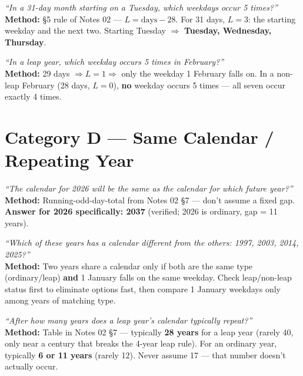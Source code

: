 \documentclass[11pt]{article}
\begin{document}
\begin{examplebox}
\emph{``In a 31-day month starting on a Tuesday, which weekdays occur 5 times?''} \\
\textbf{Method:} \S5 rule of Notes 02 --- $L = \text{days}-28$. For 31 days, $L=3$: the starting
weekday and the next two. Starting Tuesday $\Rightarrow$ \textbf{Tuesday, Wednesday, Thursday}.
\end{examplebox}

\begin{examplebox}
\emph{``In a leap year, which weekday occurs 5 times in February?''} \\
\textbf{Method:} 29 days $\Rightarrow L=1 \Rightarrow$ only the weekday 1 February falls on. In a
non-leap February (28 days, $L=0$), \textbf{no} weekday occurs 5 times --- all seven occur exactly
4 times.
\end{examplebox}

\section{Category D --- Same Calendar / Repeating Year}

\begin{examplebox}
\emph{``The calendar for 2026 will be the same as the calendar for which future year?''} \\
\textbf{Method:} Running-odd-day-total from Notes 02 \S7 --- don't assume a fixed gap.
\textbf{Answer for 2026 specifically: 2037} (verified; 2026 is ordinary, gap = 11 years).
\end{examplebox}

\begin{examplebox}
\emph{``Which of these years has a calendar different from the others: 1997, 2003, 2014, 2025?''} \\
\textbf{Method:} Two years share a calendar only if both are the same type (ordinary/leap)
\textbf{and} 1 January falls on the same weekday. Check leap/non-leap status first to eliminate
options fast, then compare 1 January weekdays only among years of matching type.
\end{examplebox}

\begin{examplebox}
\emph{``After how many years does a leap year's calendar typically repeat?''} \\
\textbf{Method:} Table in Notes 02 \S7 --- typically \textbf{28 years} for a leap year (rarely 40,
only near a century that breaks the 4-year leap rule). For an ordinary year, typically
\textbf{6 or 11 years} (rarely 12). Never assume 17 --- that number doesn't actually occur.
\end{examplebox}
\end{document}
